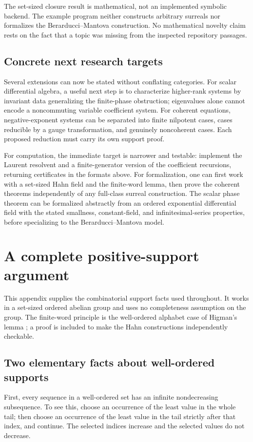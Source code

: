 \documentclass[11pt,letterpaper]{article}
\numberwithin{equation}{section}
\theoremstyle{definition}
\theoremstyle{remark}
\begin{document}
The set-sized closure result is mathematical, not an implemented symbolic
backend. The example program neither constructs arbitrary surreals nor
formalizes the Berarducci--Mantova construction. No mathematical novelty
claim rests on the fact that a topic was missing from the inspected
repository passages.

\subsection{Concrete next research targets}
Several extensions can now be stated without conflating categories.
For scalar differential algebra, a useful next step is to characterize
higher-rank systems by invariant data generalizing the finite-phase
obstruction; eigenvalues alone cannot encode a noncommuting variable
coefficient system. For coherent equations, negative-exponent systems can
be separated into finite nilpotent cases, cases reducible by a gauge
transformation, and genuinely noncoherent cases. Each proposed reduction
must carry its own support proof.

For computation, the immediate target is narrower and testable: implement
the Laurent resolvent and a finite-generator version of the coefficient
recursions, returning certificates in the formats above. For formalization,
one can first work with a set-sized Hahn field and the finite-word lemma,
then prove the coherent theorems independently of any full-class surreal
construction. The scalar phase theorem can be formalized abstractly from
an ordered exponential differential field with the stated smallness,
constant-field, and infinitesimal-series properties, before specializing
to the Berarducci--Mantova model.

\appendix
\section{A complete positive-support argument}
\label{app:support}

This appendix supplies the combinatorial support facts used throughout.
It works in a set-sized ordered abelian group and uses no completeness
assumption on the group. The finite-word principle is the well-ordered
alphabet case of Higman's lemma \cite{Higman}; a proof is included to make
the Hahn constructions independently checkable.

\subsection{Two elementary facts about well-ordered supports}
First, every sequence in a well-ordered set has an infinite nondecreasing
subsequence. To see this, choose an occurrence of the least value in the
whole tail; then choose an occurrence of the least value in the tail
strictly after that index, and continue. The selected indices increase and
the selected values do not decrease.
\end{document}
